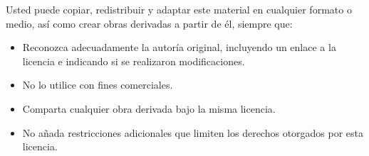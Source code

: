 \documentclass[graybox,envcountchap,sectrefs,a4paper]{svmono}
\begin{document}
\noindent
Usted puede copiar, redistribuir y adaptar este material en cualquier
formato o medio, así como crear obras derivadas a partir de él,
siempre que:

\begin{itemize}
    \item

          Reconozca adecuadamente la autoría original, incluyendo un
          enlace a la licencia e indicando si se realizaron
          modificaciones.

    \item

          No lo utilice con fines comerciales.

    \item

          Comparta cualquier obra derivada bajo la misma licencia.

    \item

          No añada restricciones adicionales que limiten los derechos
          otorgados por esta \linebreak licencia.
\end{itemize}

\frontmatter





% 
\tableofcontents


\mainmatter
% 



\backmatter


\printindex
\end{document}
